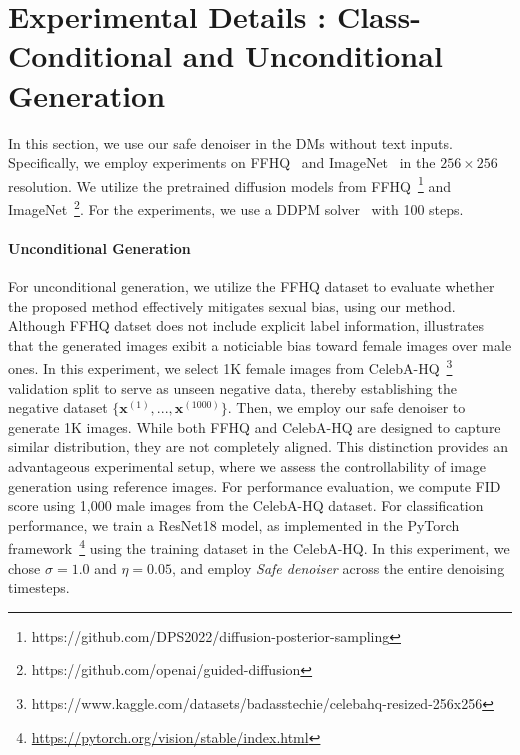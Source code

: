 \section{Experimental Details : Class-Conditional and Unconditional Generation}
\label{sec:pixel_detail}

In this section, we use our safe denoiser in the DMs without text inputs. 
Specifically, we employ experiments on FFHQ~\cite{karras2019style} and ImageNet~\cite{russakovsky2015imagenet} in the $256\times256$ resolution. 
We utilize the pretrained diffusion models from FFHQ~\cite{chung2022diffusion}\footnote{https://github.com/DPS2022/diffusion-posterior-sampling} and ImageNet~\cite{dhariwal2021diffusion}\footnote{https://github.com/openai/guided-diffusion}. 
For the experiments, we use a DDPM solver~\cite{lu2022dpm} with 100 steps.

\paragraph{Unconditional Generation}
For unconditional generation, we utilize the FFHQ dataset to evaluate whether the proposed method effectively mitigates sexual bias, using our method. 
Although FFHQ datset does not include explicit label information,  illustrates that the generated images exibit a noticiable bias toward female images over male ones. 
In this experiment, we select 1K female images from CelebA-HQ~\citep{liu2015faceattributes}\footnote{https://www.kaggle.com/datasets/badasstechie/celebahq-resized-256x256} validation split to serve as unseen negative data, thereby establishing the negative dataset $\{\mathbf{x}^{(1)},...,\mathbf{x}^{(1000)}\}$. 
Then, we employ our safe denoiser to generate 1K images.
While both FFHQ and CelebA-HQ are designed to capture similar distribution, they are not completely aligned. This distinction provides an advantageous experimental setup, where we assess the controllability of image generation using reference images. 
For performance evaluation, we compute FID~\cite{heusel2017gans} score using 1,000 male images from the CelebA-HQ dataset. 
For classification performance, we train a ResNet18 model, as implemented in the PyTorch framework~\footnote{\url{https://pytorch.org/vision/stable/index.html}} using the training dataset in the CelebA-HQ. 
In this experiment, we chose $\sigma=1.0$ and $\eta=0.05$, and employ \textit{Safe denoiser} across the entire denoising timesteps. 

